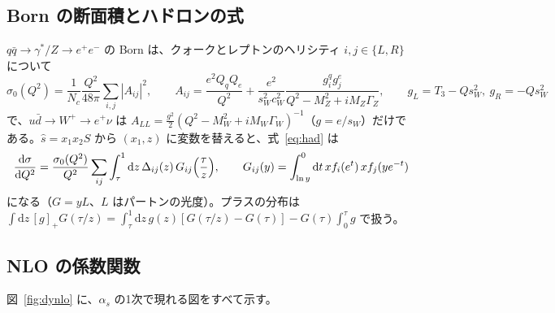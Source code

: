 \documentclass[a4paper,10pt]{ltjsarticle}
\newcommand{\dd}{\mathrm{d}}
\begin{document}
\subsection{Born の断面積とハドロンの式}\label{sec:born}

$q\bar q\to\gamma^*/Z\to e^+e^-$ の Born は、クォークとレプトンのヘリシティ $i,j\in\{L,R\}$ について
\begin{equation}
\sigma_0(Q^2)=\frac1{N_c}\frac{Q^2}{48\pi}\sum_{i,j}|A_{ij}|^2,\qquad
A_{ij}=\frac{e^2Q_qQ_e}{Q^2}+\frac{e^2}{s_W^2c_W^2}\frac{g_i^qg_j^e}{Q^2-M_Z^2+iM_Z\Gamma_Z},\qquad g_L=T_3-Qs_W^2,\ g_R=-Qs_W^2
\label{eq:born}
\end{equation}
で、$u\bar d\to W^+\to e^+\nu$ は $A_{LL}=\frac{g^2}2(Q^2-M_W^2+iM_W\Gamma_W)^{-1}$（$g=e/s_W$）だけである。$\hat s=x_1x_2S$ から $(x_1,z)$ に変数を替えると、式~\eqref{eq:had} は
\begin{equation}
\frac{\dd\sigma}{\dd Q^2}=\frac{\sigma_0(Q^2)}{Q^2}\sum_{ij}\int_\tau^1\dd z\,\Delta_{ij}(z)\,G_{ij}\Bigl(\frac\tau z\Bigr),\qquad
G_{ij}(y)=\int_{\ln y}^0\dd t\,x f_i(e^t)\,x f_j(ye^{-t})
\label{eq:lumi}
\end{equation}
になる（$G=yL$、$L$ はパートンの光度）。プラスの分布は $\int\dd z\,[g]_+G(\tau/z)=\int_\tau^1\dd z\,g(z)[G(\tau/z)-G(\tau)]-G(\tau)\int_0^\tau g$ で扱う。

\subsection{NLO の係数関数}\label{sec:coef}

図~\ref{fig:dynlo} に、$\alpha_s$ の1次で現れる図をすべて示す。
\end{document}
